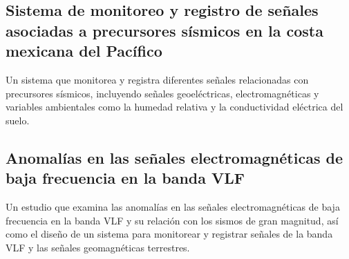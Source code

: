 \subsection{Sistema de monitoreo y registro de señales asociadas a precursores sísmicos en la costa mexicana del Pacífico }
Un sistema que monitorea y registra diferentes señales relacionadas con precursores sísmicos, incluyendo señales geoeléctricas, electromagnéticas y variables ambientales como la humedad relativa y la conductividad eléctrica del suelo.~\cite{Guerrero2019}

\subsection{Anomalías en las señales electromagnéticas de baja frecuencia en la banda VLF}
Un estudio que examina las anomalías en las señales electromagnéticas de baja frecuencia en la banda VLF y su relación con los sismos de gran magnitud, así como el diseño de un sistema para monitorear y registrar señales de la banda VLF y las señales geomagnéticas terrestres.~\cite{DeLeon2020}

